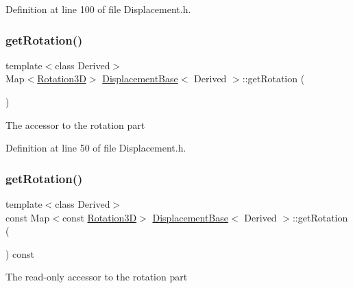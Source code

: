 Definition at line 100 of file Displacement.\+h.

\hypertarget{class_displacement_base_a76ac4502a930ddd52833d2561a13eeb5}{}\label{class_displacement_base_a76ac4502a930ddd52833d2561a13eeb5} 
\subsubsection{\texorpdfstring{get\+Rotation()}{getRotation()}\hspace{0.1cm}{\footnotesize\ttfamily [1/2]}}
{\footnotesize\ttfamily template$<$class Derived$>$ \\
Map$<$\hyperlink{class_displacement_base_aca59ea9e7f5fb3b67a489726bced7f4f}{Rotation3D}$>$ \hyperlink{class_displacement_base}{Displacement\+Base}$<$ Derived $>$\+::get\+Rotation (\begin{DoxyParamCaption}{ }\end{DoxyParamCaption})\hspace{0.3cm}{\ttfamily [inline]}}

The accessor to the rotation part 

Definition at line 50 of file Displacement.\+h.

\hypertarget{class_displacement_base_ad13124e677c2749a7d71c5cc53c2e6a1}{}\label{class_displacement_base_ad13124e677c2749a7d71c5cc53c2e6a1} 
\subsubsection{\texorpdfstring{get\+Rotation()}{getRotation()}\hspace{0.1cm}{\footnotesize\ttfamily [2/2]}}
{\footnotesize\ttfamily template$<$class Derived$>$ \\
const Map$<$const \hyperlink{class_displacement_base_aca59ea9e7f5fb3b67a489726bced7f4f}{Rotation3D}$>$ \hyperlink{class_displacement_base}{Displacement\+Base}$<$ Derived $>$\+::get\+Rotation (\begin{DoxyParamCaption}{ }\end{DoxyParamCaption}) const\hspace{0.3cm}{\ttfamily [inline]}}

The read-\/only accessor to the rotation part 

